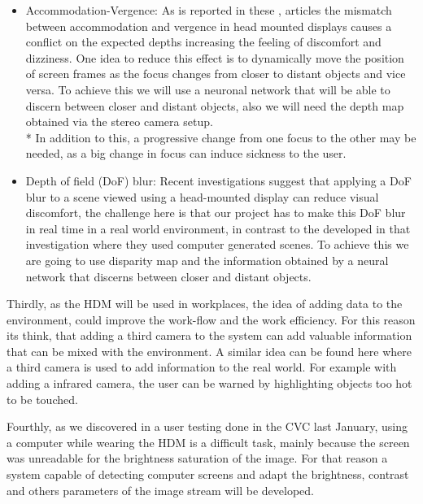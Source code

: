 \documentclass[10pt,a4paper,twocolumn,twoside]{article}
\begin{document}
\begin{itemize}
	\item Accommodation-Vergence: As is reported in these \cite{disconfortReview}, \cite{vergenceDisconfort} articles the mismatch between accommodation and vergence in head mounted displays causes a conflict on the expected depths increasing the feeling of discomfort and dizziness.  One idea to reduce this effect is to dynamically move the position of screen frames as the focus changes from closer to distant objects and vice versa. To achieve this we will use a neuronal network that will be able to discern between closer and distant objects, also we will need the depth map obtained via the stereo camera setup. \\*
	In addition to this, a progressive change from one focus to the other may be needed, as a big change in focus can induce sickness to the user.
	
	\item Depth of field (DoF) blur: Recent investigations \cite{ifftConfortDoF} suggest that applying a DoF blur to a scene viewed using a head-mounted display can reduce visual discomfort, the challenge here is that our project has to make this DoF blur in real time in a real world environment, in contrast to the developed in that investigation where they used computer generated scenes. To achieve this we are going to use disparity map and the information obtained by a neural network that discerns between closer and distant objects.
\end{itemize} 

Thirdly, as the HDM will be used in workplaces, the idea of adding data to the environment, could improve the work-flow and the work efficiency. For this reason its think, that adding a third camera to the system can add valuable information that can be mixed with the environment. A similar idea can be found here \cite{vismerge} where a third camera is used to add information to the real world. For example with adding a infrared camera, the user can be warned by highlighting objects too hot to be touched.

Fourthly, as we discovered in a user testing done in the CVC \cite{unpublishCVC} last January, using a computer while wearing the HDM is a difficult task, mainly because the screen was unreadable for the brightness saturation of the image. For that reason a system capable of detecting computer screens and adapt the brightness, contrast and others parameters of the image stream will be developed.
\end{document}
